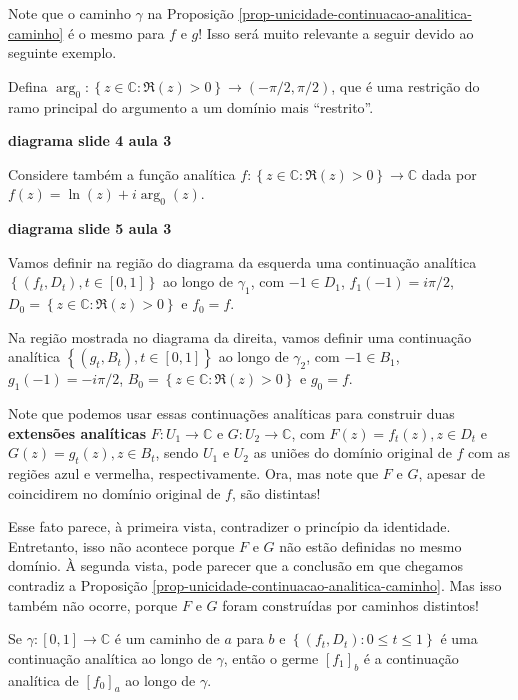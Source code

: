 \begin{observacao}
Note que o caminho $\gamma$ na 
Proposição \ref{prop-unicidade-continuacao-analitica-caminho} é o
mesmo para $f$ e $g$! Isso será muito relevante a seguir devido ao seguinte exemplo.

Defina $\arg_0: \left\{ z\in\mathbb{C} : \Re(z) > 0 \right\} \to (-\pi/2, \pi/2)$,
que é uma restrição do ramo principal do argumento a um domínio mais ``restrito''.

\begin{center}
    \textbf{diagrama slide 4 aula 3}
\end{center}

Considere também a função analítica 
$f: \left\{ z\in\mathbb{C} : \Re(z) > 0 \right\} \to\mathbb{C}$
dada por $f(z) = \ln(z) + i\arg_0(z)$.

\begin{center}
    \textbf{diagrama slide 5 aula 3}
\end{center}

Vamos definir na região do diagrama da esquerda uma continuação analítica
$\left\{ (f_t, D_t), t\in [0,1] \right\}$ ao longo de $\gamma_1$, 
com $-1\in D_1$, $f_1(-1) = i\pi/2$,
$D_0 = \left\{ z\in\mathbb{C} : \Re(z) > 0 \right\}$ e $f_0 = f$.

Na região mostrada no diagrama da direita, vamos definir uma continuação analítica
$\left\{ (g_t, B_t), t\in [0,1] \right\}$ ao longo de $\gamma_2$,
com $-1\in B_1$, $g_1(-1) = -i\pi/2$, 
$B_0 = \left\{ z\in\mathbb{C} : \Re(z) > 0 \right\}$ e $g_0 = f$.

Note que podemos usar essas continuações analíticas para construir duas
\textbf{extensões analíticas} $F:U_1\to\mathbb{C}$ e $G:U_2\to\mathbb{C}$, 
com $F(z) = f_t(z), z\in D_t$ e $G(z) = g_t(z), z\in B_t$, 
sendo $U_1$ e $U_2$ as uniões do domínio original de $f$
com as regiões azul e vermelha, respectivamente. Ora, mas note que
$F$ e $G$, apesar de coincidirem no domínio original de $f$, são distintas!

Esse fato parece, à primeira vista, contradizer o princípio da identidade. 
Entretanto, isso não acontece porque $F$ e $G$ não estão definidas no mesmo
domínio. À segunda vista, pode parecer que a conclusão em que chegamos contradiz
a Proposição \ref{prop-unicidade-continuacao-analitica-caminho}. Mas isso também 
não ocorre, porque $F$ e $G$ foram construídas por caminhos distintos!
\end{observacao}


\begin{definicao}
\label{def-continuacao-analitica-germe}
Se $\gamma: [0,1]\to\mathbb{C}$ é um caminho de $a$ para $b$ e 
$\left\{ (f_t, D_t): 0\leq t\leq 1 \right\}$ é uma continuação analítica ao
longo de $\gamma$, então o germe $[f_1]_b$ é a continuação analítica de
$[f_0]_a$ ao longo de $\gamma$.
\end{definicao}

